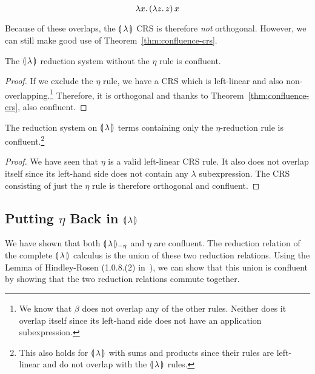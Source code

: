 $$
\lambda x.\, (\lambda z.\, z)\,x
$$

Because of these overlaps, the ${\llparenthesis \, \lambda \, \rrparenthesis}$ CRS is therefore \emph{not}
orthogonal. However, we can still make good use of
Theorem~\ref{thm:confluence-crs}.

\begin{lemma}\label{lem:confluence-int}

  The $\llparenthesis \, \lambda \, \rrparenthesis$ reduction system without the $\eta$ rule is
  confluent.
\end{lemma}

\begin{proof}
  If we exclude the $\eta$ rule, we have a CRS which is left-linear and
  also non-overlapping.\footnote{We know that $\beta$ does not overlap
    any of the other rules. Neither does it overlap itself since its
    left-hand side does not have an application subexpression.} Therefore,
  it is orthogonal and thanks to Theorem~\ref{thm:confluence-crs}, also
  confluent.
\end{proof}

\begin{lemma}\label{lem:confluence-eta}

  The reduction system on $\llparenthesis \, \lambda \, \rrparenthesis$ terms containing only the
  $\eta$-reduction rule is confluent.\footnote{This also holds for
    $\llparenthesis \, \lambda \, \rrparenthesis$ with sums and products since their rules are
    left-linear and do not overlap with the $\llparenthesis \, \lambda \, \rrparenthesis$ rules.}
\end{lemma}

\begin{proof}
  We have seen that $\eta$ is a valid left-linear CRS rule. It also
  does not overlap itself since its left-hand side does not contain any
  $\lambda$ subexpression. The CRS consisting of just the $\eta$ rule
  is therefore orthogonal and confluent.
\end{proof}


\subsection{Putting \texorpdfstring{$\eta$}{eta} Back in
  \texorpdfstring{$\llparenthesis \, \lambda \, \rrparenthesis$}{Our Calculus}}
\label{ssec:confluence-eta}

We have shown that both ${\llparenthesis \, \lambda \, \rrparenthesis_{-\eta}}$ and $\eta$ are confluent. The reduction
relation of the complete $\llparenthesis \, \lambda \, \rrparenthesis$ calculus is the union of these
two reduction relations. Using the Lemma of Hindley-Rosen (1.0.8.(2)
in~\cite{klop1992term}), we can show that this union is confluent by
showing that the two reduction relations commute together.

